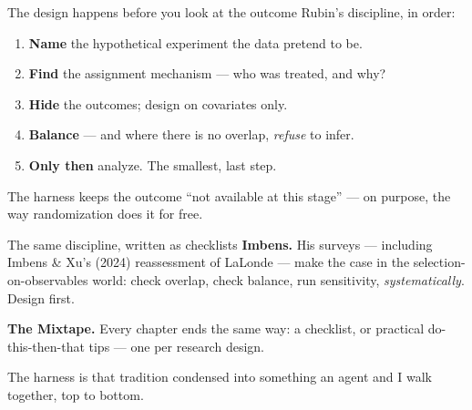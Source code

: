 \documentclass[aspectratio=169,11pt]{beamer}
\begin{document}
\begin{frame}{The design happens before you look at the outcome}
Rubin's discipline, in order:
\begin{enumerate}\setlength\itemsep{0.2em}
    \item \textbf{Name} the hypothetical experiment the data pretend to be.
    \item \textbf{Find} the assignment mechanism --- who was treated, and why?
    \item \textbf{Hide} the outcomes; design on covariates only.
    \item \textbf{Balance} --- and where there is no overlap, \emph{refuse} to infer.
    \item \textbf{Only then} analyze. The smallest, last step.
\end{enumerate}
\vspace{0.25cm}

\alert{The harness keeps the outcome ``not available at this stage'' --- on purpose, the way randomization does it for free.}
\end{frame}

\begin{frame}{The same discipline, written as checklists}
\textbf{Imbens.} His surveys --- including Imbens \& Xu's (2024) reassessment of LaLonde --- make the case in the selection-on-observables world: check overlap, check balance, run sensitivity, \emph{systematically}. Design first.
\vspace{0.3cm}

\textbf{The Mixtape.} Every chapter ends the same way: a checklist, or practical do-this-then-that tips --- one per research design.
\vspace{0.3cm}

\alert{The harness is that tradition condensed into something an agent and I walk together, top to bottom.}
\end{frame}
\end{document}

